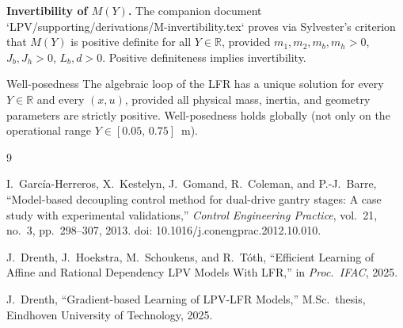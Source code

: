 \documentclass[11pt]{article}
\newcommand{\R}{\mathbb{R}}
\begin{document}
\medskip
\noindent\textbf{Invertibility of $M(Y)$.}
The companion document `LPV/supporting/derivations/M-invertibility.tex` proves via Sylvester's criterion that
$M(Y)$ is positive definite for all $Y \in \R$, provided
$m_1, m_2, m_b, m_h > 0$, $J_b, J_h > 0$, $L_b, d > 0$.
Positive definiteness implies invertibility.

\medskip
\begin{resultbox}{Well-posedness}
    The algebraic loop of the LFR has a unique solution for every $Y \in \R$ and every
    $(x, u)$, provided all physical mass, inertia, and geometry parameters are
    strictly positive.
    Well-posedness holds globally (not only on the operational range $Y \in [0.05,\,0.75]$~m).
\end{resultbox}

\newpage
\begin{thebibliography}{9}

I.~Garc{\'i}a-Herreros, X.~Kestelyn, J.~Gomand, R.~Coleman, and P.-J.~Barre,
``Model-based decoupling control method for dual-drive gantry stages:
A case study with experimental validations,''
\textit{Control Engineering Practice}, vol.~21, no.~3, pp.~298--307, 2013.
doi: 10.1016/j.conengprac.2012.10.010.

J.~Drenth, J.~Hoekstra, M.~Schoukens, and R.~T{\'o}th,
``Efficient Learning of Affine and Rational Dependency LPV Models With LFR,''
in \textit{Proc.\ IFAC}, 2025.

J.~Drenth,
``Gradient-based Learning of LPV-LFR Models,''
M.Sc.\ thesis, Eindhoven University of Technology, 2025.

\end{thebibliography}
\end{document}
